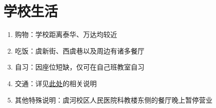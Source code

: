 \section[学校生活]{学校生活}
\begin{enumerate}
    \item 购物：学校距离泰华、万达均较近
    \item 吃饭：虞新街、西虞巷以及周边有诸多餐厅
    \item 自习：因座位短缺，仅可在自己班教室自习
    \item 交通：详见\hyperref[free_bus]{此处}的相关说明
    \item 其他特殊说明：虞河校区人民医院科教楼东侧的餐厅晚上暂停营业
\end{enumerate}
